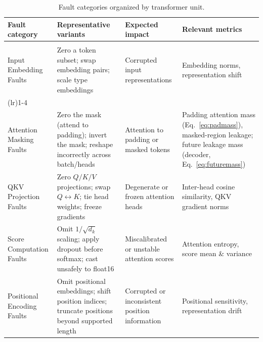 \begin{table}[!htbp]
\caption{Fault categories organized by transformer unit.}
\label{tab:fault-taxonomy}
\centering
\scriptsize
\renewcommand{\arraystretch}{1.10}
\setlength{\tabcolsep}{4pt}
\begin{tabularx}{\linewidth}{@{}
  l
  >{\raggedright\arraybackslash}X
  >{\raggedright\arraybackslash}X
  >{\raggedright\arraybackslash}X @{}}
\toprule
\textbf{Fault category} & \textbf{Representative variants} & \textbf{Expected impact} & \textbf{Relevant metrics} \\
\midrule
\addlinespace[0.2ex]
\multicolumn{4}{c}{\textit{--- Embedding ---}} \\
\addlinespace[0.2ex]
Input Embedding Faults &
Zero a token subset; swap embedding pairs; scale type embeddings &
Corrupted input representations \citep{bosio2024impact} &
Embedding norms, representation shift \citep{kornblith2019similarity} \\
\addlinespace[0.3ex]
\cmidrule(lr){1-4}
\addlinespace[0.2ex]
\multicolumn{4}{c}{\textit{--- Multi-Head Attention ---}} \\
\addlinespace[0.2ex]
Attention Masking Faults &
Zero the mask (attend to padding); invert the mask; reshape incorrectly across batch/heads &
Attention to padding or masked tokens \citep{dao2022flashattention,liu2024lost} &
Padding attention mass (Eq.~\ref{eq:padmass}), masked-region leakage; future leakage mass (decoder, Eq.~\ref{eq:futuremass}) \citep{vaswani2017attention,dao2022flashattention} \\
QKV Projection Faults &
Zero $Q/K/V$ projections; swap $Q\!\leftrightarrow\! K$; tie head weights; freeze gradients &
Degenerate or frozen attention heads \citep{michel2019sixteen,voita2019analyzing,bhojanapalli2020lowrank} &
Inter-head cosine similarity, QKV gradient norms \citep{clark2019does} \\
Score Computation Faults &
Omit $1/\!\sqrt{d_k}$ scaling; apply dropout before softmax; cast unsafely to float16 &
Miscalibrated or unstable attention scores \citep{dao2022flashattention,attentioncollapse,miller2023attention} &
Attention entropy, score mean \& variance \citep{clark2019does} \\
Positional Encoding Faults &
Omit positional embeddings; shift position indices; truncate positions beyond supported length &
Corrupted or inconsistent position information \citep{dufter-etal-2022-position,sinha-etal-2022-curious,kazemnejad2023impact} &
Positional sensitivity, representation drift \citep{sinha-etal-2022-curious,kiyono-etal-2021-shape,kornblith2019similarity} \\

\end{tabularx}
\end{table}
